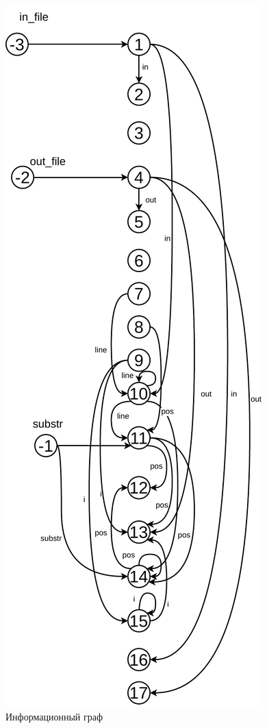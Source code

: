 \begin{figure}[h]
	\centering
	\includegraphics[height=0.9\textheight]{img/ИГ.pdf}
	\caption{Информационный граф}
	\label{fig:g2}
\end{figure}

